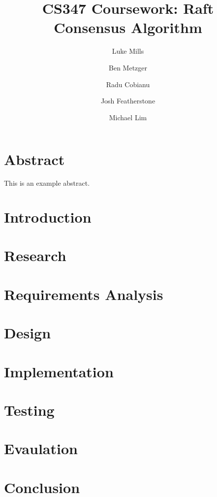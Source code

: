 \documentclass{article}
\title{CS347 Coursework: Raft Consensus Algorithm}
\author{Luke Mills \and Ben Metzger \and Radu Cobianu \and Josh Featherstone \and Michael Lim}
\begin{document}
\maketitle

\section{Abstract}

This is an example abstract.

\section{Introduction}

\section{Research}

\section{Requirements Analysis}

\section{Design}

\section{Implementation}

\section{Testing}

\section{Evaulation}

\section{Conclusion}



\end{document}
